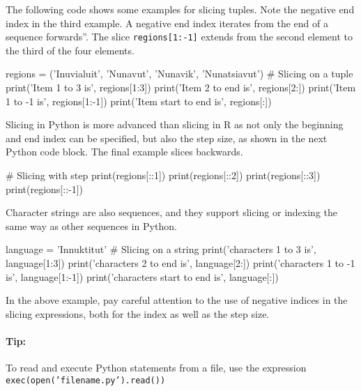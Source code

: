 The following code shows some examples for slicing tuples. Note the negative end index in the third example. A negative end index iterates from the end of a sequence forwards''. The slice \texttt{regions[1:-1]} extends from the second element to the third of the four elements. 

\begin{samepage}
\begin{pythoncode}
regions = ('Inuvialuit', 'Nunavut', 
           'Nunavik', 'Nunatsiavut')
# Slicing on a tuple
print('Item 1 to 3 is', regions[1:3])
print('Item 2 to end is', regions[2:])
print('Item 1 to -1 is', regions[1:-1])
print('Item start to end is', regions[:])
\end{pythoncode}
\end{samepage}

Slicing in Python is more advanced than slicing in R as not only the beginning and end index can be specified, but also the step size, as shown in the next Python code block. The final example slices backwards.

\begin{samepage}
\begin{pythoncode}
# Slicing with step
print(regions[::1])
print(regions[::2])
print(regions[::3])
print(regions[::-1])
\end{pythoncode}
\end{samepage}

Character strings are also sequences, and they support slicing or indexing the same way as other sequences in Python.

\begin{samepage}
\begin{pythoncode}
language = 'Innuktitut'
# Slicing on a string 
print('characters 1 to 3 is', language[1:3])
print('characters 2 to end is', language[2:])
print('characters 1 to -1 is', language[1:-1])
print('characters start to end is', language[:])
\end{pythoncode}
\end{samepage}

\noindent In the above example, pay careful attention to the use of negative indices in the slicing expressions, both for the index as well as the step size.

\begin{tcolorbox}[colback=code]
\paragraph*{Tip:} To read and execute Python statements from a file, use the expression \texttt{exec(open('filename.py').read())}
\end{tcolorbox}

